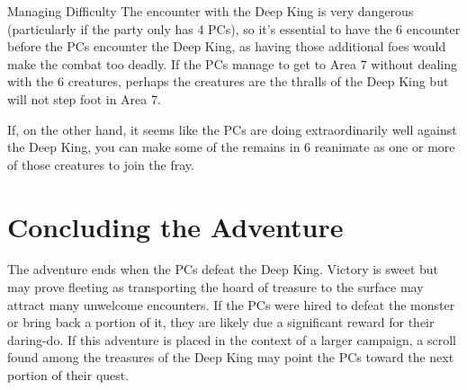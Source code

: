 \documentclass[10pt,a4paper,twoside,bg=print,twocolumn,openany,nodeprecatedcode]{dndbook}
\begin{document}
\begin{DndSidebar}[float=!b]{Managing Difficulty}
The encounter with the Deep King is very dangerous (particularly if the party only has 4 PCs), so it's essential to have the 6 encounter before the PCs encounter the Deep King, as having those additional foes would make the combat too deadly. If the PCs manage to get to Area 7 without dealing with the 6 creatures, perhaps the creatures are the thralls of the Deep King but will not step foot in Area 7.



If, on the other hand, it seems like the PCs are doing extraordinarily well against the Deep King, you can make some of the remains in 6 reanimate as one or more of those creatures to join the fray.



\end{DndSidebar}

\section{Concluding the Adventure}
The adventure ends when the PCs defeat the Deep King. Victory is sweet but may prove fleeting as transporting the hoard of treasure to the surface may attract many unwelcome encounters. If the PCs were hired to defeat the monster or bring back a portion of it, they are likely due a significant reward for their daring-do. If this adventure is placed in the context of a larger campaign, a scroll found among the treasures of the Deep King may point the PCs toward the next portion of their quest.
\end{document}
